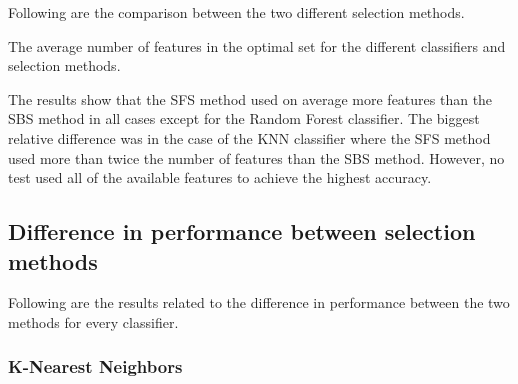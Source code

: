 \documentclass{kththesis}
\begin{document}
Following are the comparison between the two different selection methods. 


\begin{table}[h!]
  \begin{center}
    \caption{The average number of features in the optimal set for the different classifiers and selection methods.}
  \end{center}
\end{table}

The results show that the SFS method used on average more features than the SBS method in all cases except for the Random Forest classifier. The biggest relative difference was in the case of the KNN classifier where the SFS method used more than twice the number of features than the SBS method. However, no test used all of the available features to achieve the highest accuracy.


\subsection{Difference in performance between selection methods}

Following are the results related to the difference in performance between the two methods for every classifier.
\subsubsection{K-Nearest Neighbors}
\end{document}
